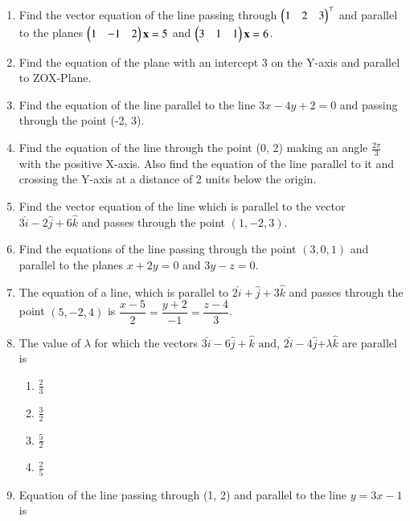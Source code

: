 \begin{enumerate}[label=\thesubsection.\arabic*, ref=\thesubsection.\theenumi]
	\item  Find the vector equation of the line passing through $\begin{pmatrix}1&2&3\end{pmatrix}^{\top}$ and parallel to the planes $\begin{pmatrix}1&-1&2\end{pmatrix}\mathbf{x} = 5$ and $\begin{pmatrix}3&1&1\end{pmatrix}\mathbf{x} = 6$.  
		\\
    \solution
		
	\item Find the equation of the plane with an intercept 3 on the Y-axis and parallel to ZOX-Plane.\\
    \solution
		
\item Find the equation of the line  parallel to the line $3x-4y+2=0$ and passing through the point (-2, 3).
\label{chapters/11/10/3/7}
\\
\solution 

\item 
	Find the equation of the line through the point (0, 2) making an angle $\frac{2\pi}{3}$ with the positive X-axis. Also find the equation of the line parallel to it and crossing the Y-axis at a distance of 2 units below the origin.
	\\
	\solution
\label{chapters/11/10/2/14}

\item  Find the vector equation of the line which is parallel to the vector $3\hat{i}-2\hat{j}+6\hat{k}$ and passes through the point $(1, -2, 3)$.
\item Find the equations of the line passing through the point $(3, 0, 1)$ and parallel to the planes $x+2y=0$ and $3y-z=0.$
\item The equation of a line,  which is parallel to $2\hat{i}+\hat{j}+3\hat{k}$ and passes through the point $(5, -2, 4)$ is $\dfrac{x-5}{2}=\dfrac{y+2}{-1}=\dfrac{z-4}{3}$.
\item The value of $\lambda$ for which the vectors $3\hat{i}-6\hat{j}+\hat{k}$ $\text{and}$,   $2\hat{i}-4\hat{j}$+$\lambda\hat{k}$ are parallel is
	\begin{enumerate}
			\setlength{\itemsep}{1ex}
\item $\frac{2}{3}$
\item $\frac{3}{2}$
\item $\frac{5}{2}$
\item $\frac{2}{5}$
	\end{enumerate}	
\item Equation of the line passing through (1, 2) and parallel to the line $y=3x-1$ is
\begin{enumerate}

\end{enumerate}
\end{enumerate}
